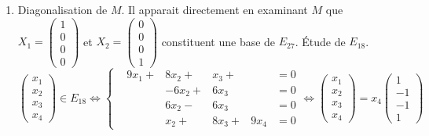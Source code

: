 \begin{enumerate}
  \item Diagonalisation de $M$.\newline
Il apparait directement en examinant $M$ que $X_1 = \begin{pmatrix} 1 \\ 0 \\ 0 \\ 0\end{pmatrix}$ et $X_2 = \begin{pmatrix} 0 \\ 0 \\ 0 \\ 1\end{pmatrix}$ constituent une base de $E_{27}$.\newline
\'Etude de $E_{18}$.
\begin{displaymath}
\begin{pmatrix} x_1 \\ x_2 \\ x_3 \\ x_4 \end{pmatrix} \in E_{18} \Leftrightarrow
\left\lbrace 
\begin{aligned}
  &9x_1 + &8x_2 + &x_3 +  &     &= 0 \\
  &       &-6x_2 + &6x_3   &     &= 0 \\
  &       &6x_2 - &6x_3   &     &= 0 \\
  &       &x_2 +  &8x_3 + &9x_4 &= 0
\end{aligned}
\right. \Leftrightarrow
\begin{pmatrix} x_1 \\ x_2 \\ x_3 \\ x_4 \end{pmatrix}=
x_4 
\begin{pmatrix} 1 \\ -1 \\ -1 \\ 1 \end{pmatrix}
\end{displaymath}


\end{enumerate}
